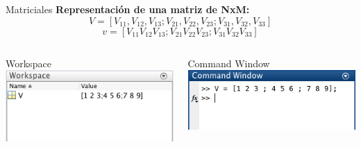 \documentclass{bredelebeamer}
\begin{document}
\begin{frame}{Matriciales}
\textbf{Representación de una matriz de NxM:}
\begin{equation*}
V = [V_{11},V_{12},V_{13} ; V_{21},V_{22},V_{23} ; V_{31},V_{32},V_{33}]
\end{equation*}
\begin{equation*}
v = [V_{11} V_{12} V_{13} ; V_{21} V_{22} V_{23} ; V_{31} V_{32} V_{33}]
\end{equation*}
\begin{columns}
\begin{column}{0.5\textwidth}
\begin{center}
Workspace\\
\includegraphics[scale=0.5]{images/pantalla10.png}
\end{center}
\end{column}
\begin{column}{0.5\textwidth}
\begin{center}
Command Window\\
\includegraphics[scale=0.5]{images/pantalla11.png}
\end{center}
\end{column}
\end{columns}
\end{frame}
\end{document}

